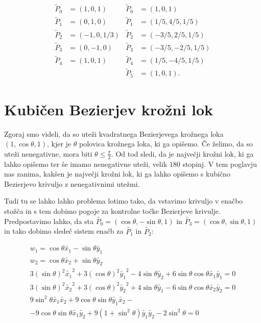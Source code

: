 \documentclass[a4paper,12pt]{article}
\begin{document}
\begin{align*}
\tilde{P}_0 &= (1,0, 1) & \tilde{P}_0 &= (1,0, 1)\\
\tilde{P}_1 &= (0, 1, 0) &\tilde{P}_1 &= (1/5, 4/5, 1/5)\\
\tilde{P}_2 &= (-1, 0, 1/3) &\tilde{P}_2 &= (-3/5, 2/5, 1/5)\\
\tilde{P}_3 &= (0, -1, 0) &\tilde{P}_3 &= (-3/5, -2/5, 1/5)\\
\tilde{P}_4 &= (1, 0, 1) & \tilde{P}_4 &= (1/5, -4/5, 1/5)\\
& & \tilde{P}_5 &= (1, 0, 1).
\end{align*}

\section{Kubičen Bezierjev krožni lok}

Zgoraj smo videli, da so uteži kvadratnega Bezierjevega krožnega loka $(1, \cos \theta, 1)$, kjer je $\theta$ polovica krožnega loka, ki ga opišemo. Če želimo, da so uteži nenegativne, mora biti $\theta \leq \frac{\pi}{2}$. Od tod sledi, da je največji krožni lok, ki ga lahko opišemo ter še imamo nenegativne uteži, velik $180$ stopinj. V tem poglavju nas zanima, kakšen je največji krožni lok, ki ga lahko opišemo s kubično Bezierjevo krivuljo z nenegativnimi utežmi.

Tudi tu se lahko lahko problema lotimo tako, da vstavimo krivuljo v enačbo stožča in s tem dobimo pogoje za kontrolne točke Bezierjeve krivulje. Predpostavimo lahko, da sta $\tilde{P_{0}} = (\cos \theta, -\sin \theta, 1)$ in $\tilde{P_{3}} = (\cos \theta, \sin \theta, 1)$ in tako dobimo sledeč sistem enačb za $\tilde{P_{1}}$ in $\tilde{P_{2}}$:

\begin{align*}
w_{1} = \cos \theta \tilde{x_{1}} - \sin \theta  \tilde{y_{1}} \\
w_{2} = \cos \theta  \tilde{x_{2}} + \sin \theta  \tilde{y_{2}} \\
3(\sin \theta )^{2} \tilde{x_{1}}^2 + 3(\cos \theta )^{2} \tilde{y_{1}}^2 - 4 \sin \theta \tilde{y_{2}} + 6\sin \theta \cos \theta \tilde{x_{1}}\tilde{y_{1}} = 0 \\
3(\sin \theta )^{2} \tilde{x_{2}}^2 + 3(\cos \theta )^{2} \tilde{y_{2}}^2 + 4 \sin \theta \tilde{y_{1}} - 6\sin \theta \cos \theta \tilde{x_{2}}\tilde{y_{2}} = 0 \\
9\sin^{2}\theta \tilde{x_{1}}\tilde{x_{2}} + 9 \cos \theta \sin \theta \tilde{y_{1}}\tilde{x_{2}} -\\ -9\cos \theta \sin \theta \tilde{x_{1}} \tilde{y_{2}} + 9 (1 + \sin^2 \theta) \tilde{y_{1}} \tilde{y_{2}} - 2\sin^2\theta = 0
\end{align*}
\end{document}
